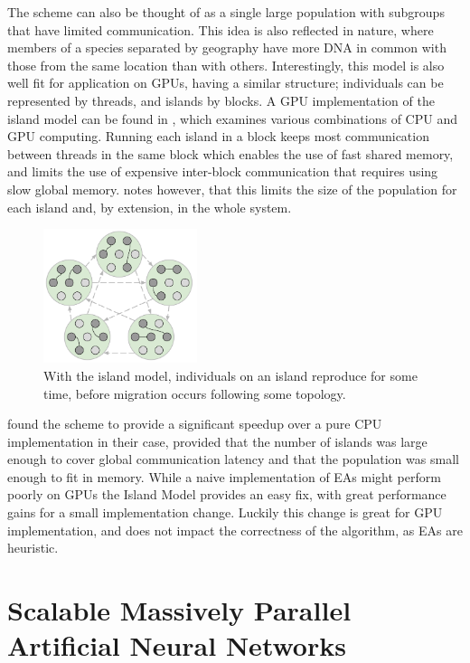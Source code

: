 \documentclass[twocolumn]{article} %
\begin{document}
		The scheme can also be thought of as a single large population with subgroups that have limited communication. This
		idea is also reflected in nature, where members of a species separated by geography have more DNA in common with those
		from the same location than with others. Interestingly, this model is also well fit for application on GPUs, having a
		similar structure; individuals can be represented by threads, and islands by blocks. A GPU implementation of the
		island model can be found in \cite{luong10}, which examines various combinations of CPU and GPU computing. Running
		each island in a block keeps most	communication between threads in the same block which enables the use of fast shared
		memory, and limits the use of expensive inter-block communication that requires using slow global memory.
		\cite{luong10} notes however, that this limits the size of the population for each island and, by extension, in the
		whole system.
		
		\begin{figure}[h]
			\centering
			\includegraphics[width=0.4\textwidth]{island}
			\caption{With the island model, individuals on an island reproduce for some time, before migration occurs following some topology.}
			\label{fig:island}
		\end{figure}
		
		\cite{luong10} found the scheme to provide a significant speedup over a pure CPU implementation in their case, provided that the
		number of islands was large enough to cover global communication latency and that the population was small enough to
		fit in memory. While a naive implementation of EAs might perform poorly on GPUs the Island Model provides an easy fix, with great
		performance gains for a small implementation change. Luckily this change is great for GPU implementation, and does not
		impact the correctness of the algorithm, as EAs are heuristic.
		
\section*{Scalable Massively Parallel Artificial Neural Networks}
\end{document}
